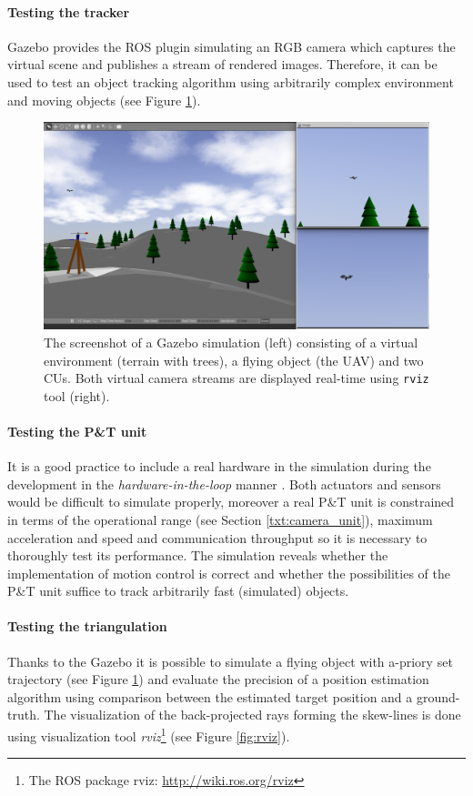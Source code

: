 \paragraph{Testing the tracker} Gazebo provides the ROS plugin simulating an RGB camera which captures the virtual scene and publishes a stream of rendered images. Therefore, it can be used to test an object tracking algorithm using arbitrarily complex environment and moving objects (see Figure \ref{fig:gazebo}).

\begin{figure}[htb]
	\centering
	\includegraphics[width=0.65\linewidth]{fig/gazebo.png}
	\caption{The screenshot of a Gazebo simulation (left) consisting of a virtual environment (terrain with trees), a flying object (the UAV) and two CUs. Both virtual camera streams are displayed real-time using \texttt{rviz} tool (right).}
	\label{fig:gazebo}
\end{figure}

\paragraph{Testing the P\&T unit} It is a good practice to include a real hardware in the simulation during the development in the \textit{hardware-in-the-loop} manner \cite{on_hw_in_the_loop}. Both actuators and sensors would be difficult to simulate properly, moreover a real P\&T unit is constrained in terms of the operational range (see Section \ref{txt:camera_unit}), maximum acceleration and speed and communication throughput so it is necessary to thoroughly test its performance. The simulation reveals whether the implementation of motion control is correct and whether the possibilities of the P\&T unit suffice to track arbitrarily fast (simulated) objects.

\paragraph{Testing the triangulation} Thanks to the Gazebo it is possible to simulate a flying object with a-priory set trajectory (see Figure \ref{fig:gazebo}) and evaluate the precision of a position estimation algorithm using comparison between the estimated target position and a ground-truth. The visualization of the back-projected rays forming the skew-lines is done using visualization tool \textit{rviz}\footnote{The ROS package rviz: \url{http://wiki.ros.org/rviz}} (see Figure \ref{fig:rviz}).

